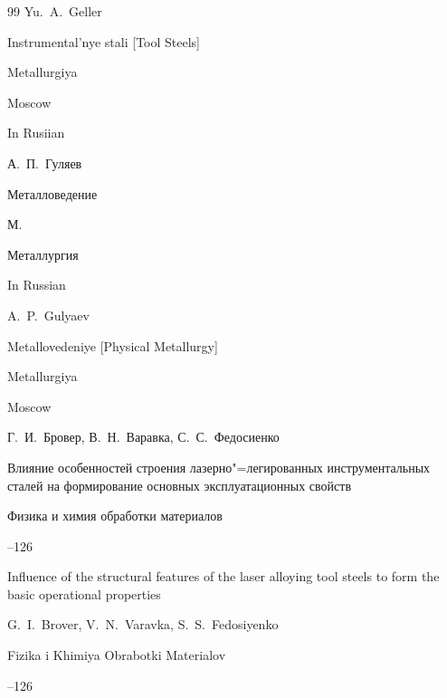 \begin{thebibliography}{99}
\by Yu.~A.~Geller

\book Instrumental'nye stali \rm [Tool Steels] 

\publ Metallurgiya

\publaddr Moscow 



\lang In Rusiian






\by А.~П.~Гуляев

\book Металловедение

\publaddr М.

\publ Металлургия



\misctransl

\lang In Russian

\by  A.~P.~Gulyaev

\book Metallovedeniye \rm  [Physical Metallurgy]

\publ Metallurgiya

\publaddr Moscow 








\by Г.~И.~Бровер, В.~Н.~Варавка, С.~С.~Федосиенко

\paper Влияние особенностей строения лазерно"=легированных инструментальных сталей на формирование основных эксплуатационных свойств

\jour Физика и химия обработки материалов



--126

\misctransl

\paper Influence of the structural features of the laser alloying  tool steels to form the basic operational properties

\by G.~I.~Brover, V.~N.~Varavka, S.~S.~Fedosiyenko

\jour Fizika i Khimiya Obrabotki Materialov



--126


\end{thebibliography}
